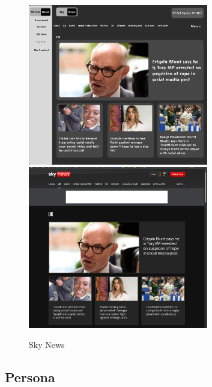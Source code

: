 \documentclass[a4paper]{article}
\begin{document}
\begin{figure}[H] %
	\centering %
	\includegraphics[width=0.7\textwidth]{./images/Sky news 2.png} %
	\includegraphics[width=0.7\textwidth]{./images/Sky news.png} %
	\caption*{Sky News} %
	\label{Fig.Sky News} %
\end{figure}

\subsection{Persona}
\end{document}
